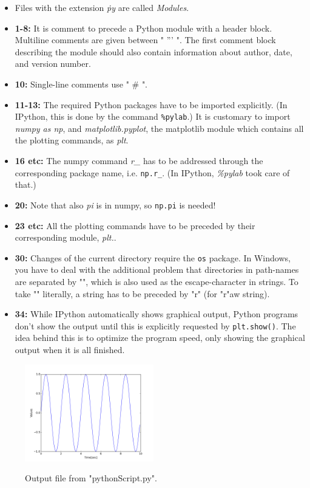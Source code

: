 \begin{itemize}
  \item Files with the extension \emph{\.py} are called \emph{Modules}.
  \item \textbf{1-8:} It is comment to precede a Python module with a header block. Multiline comments are given between " ''' ". The first comment block describing the module should also contain information about author, date, and version number.
  \item \textbf{10:}  Single-line comments use " \# ".
  \item \textbf{11-13:} The required Python packages have to be imported explicitly. (In IPython, this is done by the command \lstinline{%pylab}.) It is customary to import \emph{numpy as np}, and \emph{matplotlib.pyplot}, the matplotlib module which contains all the plotting commands, as \emph{plt}.

  \item \textbf{16 etc:} The numpy command \emph{r\_} has to be addressed through the corresponding package name, i.e. \lstinline{np.r_}. (In IPython, \emph{\%pylab} took care of that.)
  \item \textbf{20:}  Note that also \emph{pi} is in numpy, so \lstinline{np.pi} is needed!
 \item \textbf{23 etc:}  All the plotting commands have to be preceded by their corresponding module, \emph{plt.}.
  \item \textbf{30:} Changes of the current directory require the \lstinline{os} package. In Windows, you have to deal with the additional problem that directories in path-names are separated by "", which is also used as the escape-character in strings. To take "" literally, a string has to be preceded by "r" (for "r"aw string).
  \item \textbf{34:} While IPython automatically shows graphical output, Python programs don't show the output until this is explicitly requested by \lstinline{plt.show()}. The idea behind this is to optimize the program speed, only showing the graphical output when it is all finished.
\end{itemize}

\begin{figure}
  \centering
  \includegraphics[width=0.5\textwidth]{../Images/Sinewave.png}\\
  \caption{Output file from "pythonScript.py".}
  \label{fig:pythonScript}
\end{figure}



